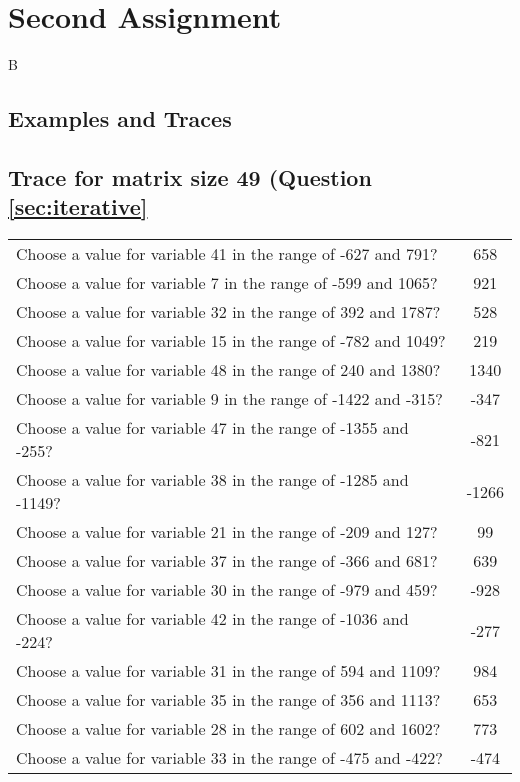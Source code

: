 \documentclass[10pt,a4paper]{article}
\begin{document}
\section{Second Assignment}
B
\begin{appendix}
\section{Examples and Traces}
\phantom{*Easter Egg*}
\subsection{Trace for matrix size 49 (Question \ref{sec:iterative}}
\label{sec:app:iterative}
\begin{tabular}{ l  c }
Choose a value for variable 41 in the range of -627 and 791? & 658
\\Choose a value for variable 7 in the range of -599 and 1065? & 921
\\Choose a value for variable 32 in the range of 392 and 1787? & 528
\\Choose a value for variable 15 in the range of -782 and 1049? & 219
\\Choose a value for variable 48 in the range of 240 and 1380? & 1340
\\Choose a value for variable 9 in the range of -1422 and -315? & -347
\\Choose a value for variable 47 in the range of -1355 and -255? & -821
\\Choose a value for variable 38 in the range of -1285 and -1149? & -1266
\\Choose a value for variable 21 in the range of -209 and 127? & 99
\\Choose a value for variable 37 in the range of -366 and 681? & 639
\\Choose a value for variable 30 in the range of -979 and 459? & -928
\\Choose a value for variable 42 in the range of -1036 and -224? & -277
\\Choose a value for variable 31 in the range of 594 and 1109? & 984
\\Choose a value for variable 35 in the range of 356 and 1113? & 653
\\Choose a value for variable 28 in the range of 602 and 1602? & 773
\\Choose a value for variable 33 in the range of -475 and -422? & -474

\end{tabular}
\end{appendix}
\end{document}
